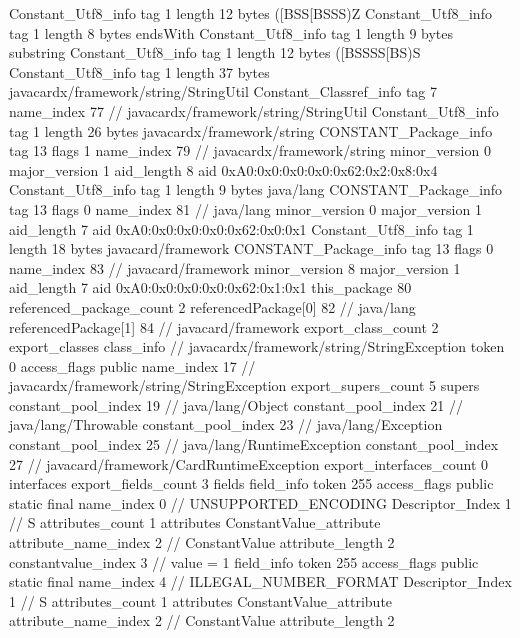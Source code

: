 {{{		}
		Constant_Utf8_info {
			tag	1
			length	12
			bytes	([BSS[BSSS)Z
		}
		Constant_Utf8_info {
			tag	1
			length	8
			bytes	endsWith
		}
		Constant_Utf8_info {
			tag	1
			length	9
			bytes	substring
		}
		Constant_Utf8_info {
			tag	1
			length	12
			bytes	([BSSSS[BS)S
		}
		Constant_Utf8_info {
			tag	1
			length	37
			bytes	javacardx/framework/string/StringUtil
		}
		Constant_Classref_info {
			tag	7
			name_index	77		// javacardx/framework/string/StringUtil
		}
		Constant_Utf8_info {
			tag	1
			length	26
			bytes	javacardx/framework/string
		}
		CONSTANT_Package_info {
			tag	13
			flags	1
			name_index	79		// javacardx/framework/string
			minor_version	0
			major_version	1
			aid_length	8
			aid	0xA0:0x0:0x0:0x0:0x62:0x2:0x8:0x4
		}
		Constant_Utf8_info {
			tag	1
			length	9
			bytes	java/lang
		}
		CONSTANT_Package_info {
			tag	13
			flags	0
			name_index	81		// java/lang
			minor_version	0
			major_version	1
			aid_length	7
			aid	0xA0:0x0:0x0:0x0:0x62:0x0:0x1
		}
		Constant_Utf8_info {
			tag	1
			length	18
			bytes	javacard/framework
		}
		CONSTANT_Package_info {
			tag	13
			flags	0
			name_index	83		// javacard/framework
			minor_version	8
			major_version	1
			aid_length	7
			aid	0xA0:0x0:0x0:0x0:0x62:0x1:0x1
		}
	}
	this_package	80
	referenced_package_count	2
	referencedPackage[0]	82		// java/lang
	referencedPackage[1]	84		// javacard/framework
	export_class_count	2
	export_classes {
		class_info {		// javacardx/framework/string/StringException
			token	0
			access_flags	public
			name_index	17		// javacardx/framework/string/StringException
			export_supers_count	5
			supers {
				constant_pool_index	19		// java/lang/Object
				constant_pool_index	21		// java/lang/Throwable
				constant_pool_index	23		// java/lang/Exception
				constant_pool_index	25		// java/lang/RuntimeException
				constant_pool_index	27		// javacard/framework/CardRuntimeException
			}
			export_interfaces_count	0
			interfaces {
			}
			export_fields_count	3
			fields {
			field_info {
				token	255
				access_flags	public static final
				name_index	0		// UNSUPPORTED_ENCODING
				Descriptor_Index	1		// S
				attributes_count	1
				attributes {
				ConstantValue_attribute {
					attribute_name_index	2		// ConstantValue
					attribute_length	2
					constantvalue_index	3		// value = 1
				}
				}
			}
			field_info {
				token	255
				access_flags	public static final
				name_index	4		// ILLEGAL_NUMBER_FORMAT
				Descriptor_Index	1		// S
				attributes_count	1
				attributes {
				ConstantValue_attribute {
					attribute_name_index	2		// ConstantValue
					attribute_length	2
}}}}}}}
